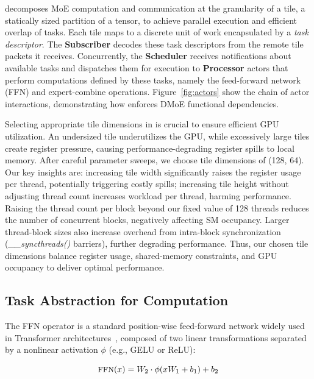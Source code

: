 \sysname decomposes MoE computation and communication at the granularity of a tile, a statically sized partition of a tensor,
to achieve parallel execution and efficient overlap of tasks.
Each tile maps to a discrete unit of work encapsulated by a \emph{task descriptor}.
The \textbf{Subscriber} decodes these task descriptors from the remote tile packets it receives.
Concurrently, the \textbf{Scheduler} receives notifications about available tasks and dispatches them for execution
to \textbf{Processor} actors that perform computations defined by these tasks,
namely the feed-forward network (FFN) and expert-combine operations.
Figure~\ref{fig:actors} show the chain of actor interactions, demonstrating how \sysname
enforces DMoE functional dependencies.

Selecting appropriate tile dimensions in \sysname is crucial to ensure efficient GPU utilization.
An undersized tile underutilizes the GPU,
while excessively large tiles create register pressure,
causing performance-degrading register spills to local memory.
After careful parameter sweeps,
we choose tile dimensions of (128, 64).
Our key insights are: increasing tile width significantly raises the register usage per thread,
potentially triggering costly spills;
increasing tile height without adjusting thread count increases workload per thread, harming performance.
Raising the thread count per block beyond our fixed value of 128 threads reduces the number of concurrent blocks,
negatively affecting SM occupancy.
Larger thread-block sizes also increase overhead from intra-block synchronization (\emph{\_\_syncthreads()} barriers),
further degrading performance.
Thus, our chosen tile dimensions balance register usage, shared-memory constraints,
and GPU occupancy to deliver optimal performance.

\subsection{Task Abstraction for Computation}\label{subsec:task-abstraction-for-computation}

The FFN operator is a standard position-wise feed-forward network widely used in Transformer architectures~\cite{NIPS2017_3f5ee243}, composed of two linear transformations separated by a nonlinear activation $\phi$ (e.g., GELU or ReLU):

\begin{equation}\label{eq:ffn}
    \small
\textrm{FFN}(x) = W_2 \cdot \phi(x W_1 + b_1) + b_2
\end{equation}

